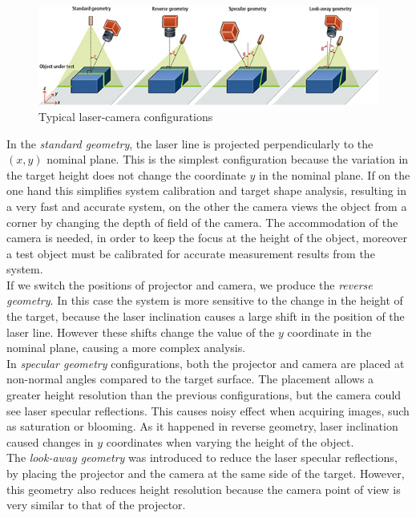 \begin{figure}[!b]
  \centering
  \includegraphics[width=\textwidth]{./images/tech/tech_geometry.jpg}
  \caption{Typical laser-camera configurations}
  \label{fig::triang_geoms}
\end{figure}

\noindent
In the \textit{standard geometry}, the laser line is projected perpendicularly to the $\left( x, y \right)$ nominal plane. This is the simplest configuration because the variation in the target height does not change the coordinate $y$ in the nominal plane. If on the one hand this simplifies system calibration and target shape analysis, resulting in a very fast and accurate system, on the other the camera views the object from a corner by changing the depth of field of the camera. The accommodation of the camera is needed, in order to keep the focus at the height of the object, moreover a test object must be calibrated for accurate measurement results from the system. \\

\noindent
If we switch the positions of projector and camera, we produce the \textit{reverse geometry}. In this case the system is more sensitive to the change in the height of the target, because the laser inclination causes a large shift in the position of the laser line. However these shifts change the value of the $y$ coordinate in the nominal plane, causing a more complex analysis.\\

\noindent
In \textit{specular geometry} configurations, both the projector and camera are placed at non-normal angles compared to the target surface. The placement allows a greater height resolution than the previous configurations, but the camera could see laser specular reflections. This causes noisy effect when acquiring images, such as saturation or blooming. As it happened in reverse geometry, laser inclination caused changes in $y$ coordinates when varying the height of the object. \\

\noindent
The \textit{look-away geometry} was introduced to reduce the laser specular reflections, by placing the projector and the camera at the same side of the target. However, this geometry also reduces height resolution because the camera point of view is very similar to that of the projector. \\

